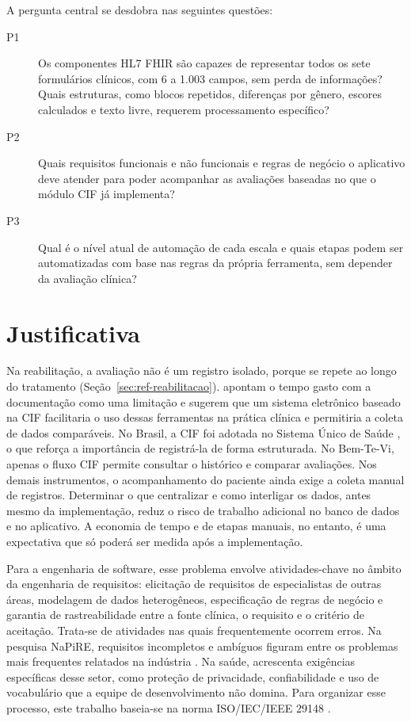 A pergunta central se desdobra nas seguintes questões:

\begin{description}
	\item [P1] Os componentes HL7 FHIR são capazes de representar todos os sete formulários clínicos, com 6 a
1.003 campos, sem perda de informações? Quais estruturas, como blocos repetidos,
diferenças por gênero, escores calculados e texto livre, requerem processamento específico?
	\item [P2] Quais requisitos funcionais e não funcionais e regras de negócio o aplicativo
deve atender para poder acompanhar as avaliações baseadas no que o módulo
CIF já implementa?
	\item [P3] Qual é o nível atual de automação de cada escala e quais etapas podem ser
automatizadas com base nas regras da própria ferramenta, sem depender da avaliação clínica?
\end{description}

\section{Justificativa}

Na reabilitação, a avaliação não é um registro isolado, porque se repete ao longo do tratamento
(Seção~\ref{sec:ref-reabilitacao}).  apontam o tempo gasto com a documentação como uma limitação
e sugerem que um sistema eletrônico baseado na CIF facilitaria o uso dessas ferramentas
na prática clínica e permitiria a coleta de dados comparáveis. No Brasil, a CIF foi adotada no Sistema Único de Saúde \cite{cns452:2012}, o que reforça a importância de
registrá-la de forma estruturada. No Bem-Te-Vi, apenas o fluxo CIF permite consultar o histórico e comparar avaliações.
Nos demais instrumentos, o acompanhamento do paciente ainda exige
a coleta manual de registros. Determinar o que centralizar e como interligar os dados, antes mesmo da
implementação, reduz o risco de trabalho adicional no banco de dados e no aplicativo. A economia
de tempo e de etapas manuais, no entanto, é uma expectativa que só poderá ser medida após
a implementação.

Para a engenharia de software, esse problema envolve atividades-chave no âmbito
da engenharia de requisitos: elicitação de requisitos de especialistas de outras áreas, modelagem
de dados heterogêneos, especificação de regras de negócio e garantia de rastreabilidade entre a fonte clínica,
o requisito e o critério de aceitação. Trata-se de atividades nas quais frequentemente ocorrem erros. Na pesquisa NaPiRE, requisitos incompletos e ambíguos figuram entre os
problemas mais frequentes relatados na indústria \cite{mendezfernandez2017napire}. Na saúde,  acrescenta exigências específicas desse setor, como
proteção de privacidade, confiabilidade e uso de vocabulário que a equipe de desenvolvimento não domina. Para organizar esse processo, este trabalho baseia-se na norma ISO/IEC/IEEE
29148 \cite{iso29148:2018}.


